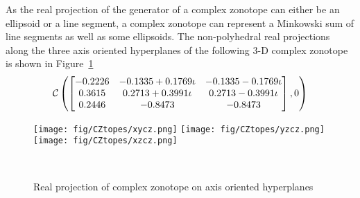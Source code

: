 As the real projection of the generator of a complex zonotope can
either be an ellipsoid or a line segment, a complex zonotope can
represent a Minkowski sum of line segments as well as some
ellipsoids.  The non-polyhedral real projections along the three axis
oriented hyperplanes of the following 3-D complex zonotope is shown in
Figure~\ref{fig:3dcztope}
%
\[
\mathit{\mathcal{C}}\left(\left[\begin{matrix}-0.2226  & -0.1335 + 0.1769\iota  & -0.1335 - 0.1769\iota\\
   0.3615 &   0.2713 + 0.3991\iota &  0.2713 - 0.3991\iota\\
   0.2446 &  -0.8473 &  -0.8473\end{matrix}\right],0\right)
\]
%
\begin{figure}
\center
\texttt{[image: fig/CZtopes/xycz.png]}
\texttt{[image: fig/CZtopes/yzcz.png]}
\texttt{[image: fig/CZtopes/xzcz.png]}
\caption{Real projection of complex zonotope on axis oriented hyperplanes}~\label{fig:3dcztope}
\end{figure}
%

